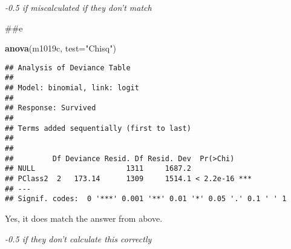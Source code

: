 \documentclass[]{article}
\newenvironment{Shaded}{\begin{snugshade}}{\end{snugshade}}
\newcommand{\DataTypeTok}[1]{\textcolor[rgb]{0.13,0.29,0.53}{#1}}
\newcommand{\KeywordTok}[1]{\textcolor[rgb]{0.13,0.29,0.53}{\textbf{#1}}}
\newcommand{\NormalTok}[1]{#1}
\newcommand{\StringTok}[1]{\textcolor[rgb]{0.31,0.60,0.02}{#1}}
\begin{document}
\emph{-0.5 if miscalculated if they don't match }

\#\#e

\begin{Shaded}
\begin{Highlighting}[]
\KeywordTok{anova}\NormalTok{(m1019c, }\DataTypeTok{test=}\StringTok{"Chisq"}\NormalTok{)}
\end{Highlighting}
\end{Shaded}

\begin{verbatim}
## Analysis of Deviance Table
## 
## Model: binomial, link: logit
## 
## Response: Survived
## 
## Terms added sequentially (first to last)
## 
## 
##         Df Deviance Resid. Df Resid. Dev  Pr(>Chi)    
## NULL                     1311     1687.2              
## PClass2  2   173.14      1309     1514.1 < 2.2e-16 ***
## ---
## Signif. codes:  0 '***' 0.001 '**' 0.01 '*' 0.05 '.' 0.1 ' ' 1
\end{verbatim}

Yes, it does match the answer from above.

\emph{-0.5 if they don't calculate this correctly}
\end{document}

